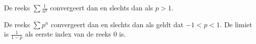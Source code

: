 De reeks \(\sum\frac{1}{n^{p}}\) convergeert dan en slechts dan als \(p>1\).

De reeks \(\sum p^{n}\) convergeert dan en slechts dan als geldt dat \(-1<p<1\). De limiet is \(\frac{1}{1-p}\) als eerste index van de reeks \(0\) is.